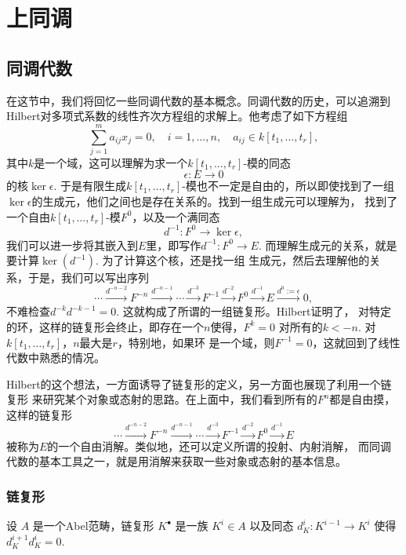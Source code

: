 \chapter{上同调}

\section{同调代数}

在这节中，我们将回忆一些同调代数的基本概念。同调代数的历史，可以追溯到
Hilbert对多项式系数的线性齐次方程组的求解上。他考虑了如下方程组
\[
    \sum_{j=1}^ma_{ij}x_j=0,\quad i=1,\dots,n,\quad 
    a_{ij}\in k[t_1,\dots,t_r],
\]
其中$k$是一个域，这可以理解为求一个$k[t_1,\dots,t_r]$-模的同态
\[
    \epsilon:E\to 0
\]
的核$\ker \epsilon$. 
于是有限生成$k[t_1,\dots,t_r]$-模也不一定是自由的，所以即使找到了一组
$\ker \epsilon$的生成元，他们之间也是存在关系的。找到一组生成元可以理解为，
找到了一个自由$k[t_1,\dots,t_r]$-模$F^0$，以及一个满同态
\[
    d^{-1}:F^0\to \ker \epsilon,
\]
我们可以进一步将其嵌入到$E$里，即写作$d^{-1}:F^0\to E$.
而理解生成元的关系，就是要计算$\ker(d^{-1})$. 为了计算这个核，还是找一组
生成元，然后去理解他的关系，于是，我们可以写出序列
\[
    \cdots\xrightarrow{d^{-n-2}}F^{-n}\xrightarrow{d^{-n-1}}\cdots \xrightarrow{d^{-3}}F^{-1}\xrightarrow{d^{-2}}F^0\xrightarrow{d^{-1}}E\xrightarrow{d^0:=\epsilon} 0,
\]
不难检查$d^{-k}d^{-k-1}=0$. 这就构成了所谓的一组链复形。Hilbert证明了，
对特定的环，这样的链复形会终止，即存在一个$n$使得，$F^{k}=0$
对所有的$k<-n$. 对$k[t_1,\dots,t_r]$，$n$最大是$r$，特别地，如果环
是一个域，则$F^{-1}=0$，这就回到了线性代数中熟悉的情况。

Hilbert的这个想法，一方面诱导了链复形的定义，另一方面也展现了利用一个链复形
来研究某个对象或态射的思路。在上面中，我们看到所有的$F^{n}$都是自由摸，
这样的链复形
\[
    \cdots\xrightarrow{d^{-n-2}}F^{-n}\xrightarrow{d^{-n-1}}\cdots \xrightarrow{d^{-3}}F^{-1}\xrightarrow{d^{-2}}F^0\xrightarrow{d^{-1}}E
\]
被称为$E$的一个自由消解。类似地，还可以定义所谓的投射、内射消解，
而同调代数的基本工具之一，就是用消解来获取一些对象或态射的基本信息。



\subsection{链复形}

\begin{para}[链复形]
	设 $A$ 是一个Abel范畴，链复形 $K^\bullet$ 是一族 $K^i\in A$ 以及同态 
    $d^i_K:K^{i-1}\to K^i$ 使得 $d_K^{i+1}d_K^i=0$.
\end{para}

